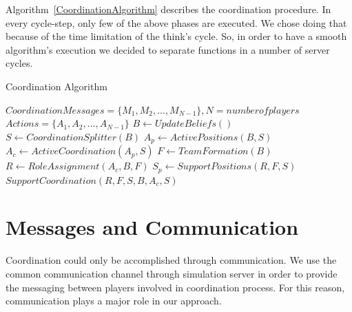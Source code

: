 Algorithm~\ref{CoordinationAlgorithm} describes the coordination procedure. In every cycle-step, only few of the above phases are executed. We chose doing that because of the time limitation of the think's cycle. So, in order to have a smooth algorithm's execution we decided to separate functions in a number of server cycles.

\begin{algorithm}[ht!]
\caption{Coordination Algorithm }
\label{CoordinationAlgorithm}
\begin{algorithmic}[1]
$Coordination Messages = \lbrace M_{1},M_{2},...,M_{N-1} \rbrace, N = number of players $
$Actions = \lbrace A_{1},A_{2},...,A_{N-1} \rbrace$
\STATE $B \leftarrow Update Beliefs() $
\STATE $S \leftarrow Coordination Splitter(B) $
\STATE $A_{p} \leftarrow Active Positions(B,S) $
\STATE $A_{c} \leftarrow Active Coordination(A_{p},S) $
\STATE $ F \leftarrow TeamFormation(B) $
\STATE $ R \leftarrow Role Assignment(A_{c},B,F) $
\STATE $ S_{p} \leftarrow Support Positions(R,F,S) $
\STATE $ Support Coordination(R,F,S,B,A_{c},S) $
\ENDIF
\end{algorithmic}
\end{algorithm}


\section{Messages and Communication}
Coordination could only be accomplished through communication. We use the common communication channel through simulation server in order to provide the messaging between players involved in coordination process. For this reason, communication plays a major role in our approach. 

